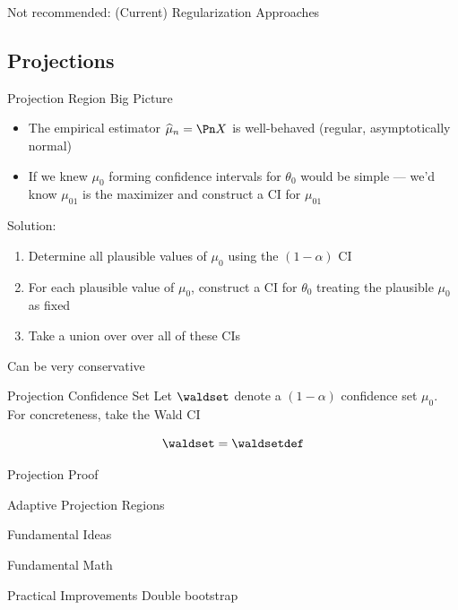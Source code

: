 \documentclass[aspectratio=169, professionalfonts]{beamer}
\begin{document}
\begin{frame}{Not recommended: (Current) Regularization Approaches}
\end{frame}
\subsection{Projections}
\begin{frame}{Projection Region Big Picture}
	\begin{itemize}
		\item The empirical estimator $\widehat{\mu}_n = \Pn X$ is well-behaved (regular, asymptotically normal)
		      \vfill \pause
		\item If we knew $\mu_0$ forming confidence intervals for ${\theta}_0$
		      would be simple --- we'd know $\mu_{01}$ is the maximizer and
		      construct a CI for $\mu_{01}$
	\end{itemize}
	\vfill \pause
	Solution:
	\begin{enumerate}
		\item Determine all plausible values of $\mu_0$ using the $(1- \alpha)$ CI
		\item For each plausible value of $\mu_0$, construct a CI for ${\theta}_0$
		      treating the plausible $\mu_0$ as fixed
		\item Take a union over over all of these CIs
	\end{enumerate}
	\vfill \pause
	Can be very conservative

\end{frame}
\begin{frame}{Projection Confidence Set}
	Let $\waldset$ denote a $(1-\alpha)$ confidence set $\mu_0$. For concreteness, take
	the Wald CI

	$$\waldset = \waldsetdef$$

	\vfill \pause
\end{frame}
\begin{frame}{Projection Proof}
\end{frame}

\begin{frame}{Adaptive Projection Regions}
\end{frame}
\begin{frame}{Fundamental Ideas}
\end{frame}
\begin{frame}{Fundamental Math}
\end{frame}
\begin{frame}{Practical Improvements}
	Double bootstrap
\end{frame}
\end{document}
